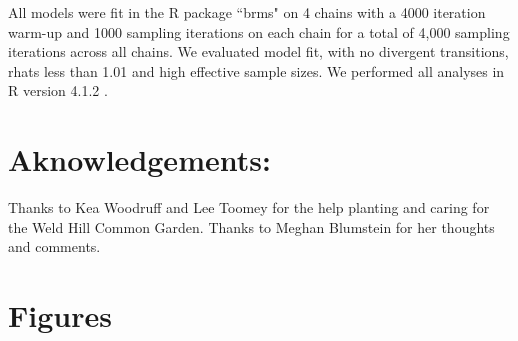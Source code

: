 \documentclass{article}[12pt]
\begin{document}
All models were fit in the R package ``brms" \citep{Burkner2018} on 4 chains with a 4000 iteration warm-up and 1000 sampling iterations on each chain for a total of 4,000 sampling iterations across all chains. We evaluated model fit, with no divergent transitions, rhats less than 1.01 and high effective sample sizes. We performed all analyses in R version 4.1.2 \citep{R2021}.

\section{Aknowledgements:}
Thanks to Kea Woodruff and Lee Toomey for the help planting and caring for the Weld Hill Common Garden. Thanks to Meghan Blumstein for her thoughts and comments.

\newpage
\section{Figures} %
\end{document}
